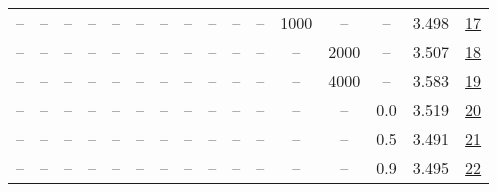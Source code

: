 \begin{table}[H]
\begin{tabular}{cccccccccccccccc}
-- & -- & -- & -- & -- & -- & -- & -- & -- & -- & -- & 1000 & -- & -- & 3.498 & \href{https://wandb.ai/stanford-mercury/optimizer-scaling/runs/sweep-130m-2B-kron8264balr0.002-wd0.7-b10.95-plr0.2-pis1-gn1-nor-52689f}{17} \\
-- & -- & -- & -- & -- & -- & -- & -- & -- & -- & -- & -- & 2000 & -- & 3.507 & \href{https://wandb.ai/stanford-mercury/optimizer-scaling/runs/sweep-130m-2B-kron9117dclr0.002-wd0.7-b10.95-plr0.2-pis1-gn1-nor-df1fa7}{18} \\
-- & -- & -- & -- & -- & -- & -- & -- & -- & -- & -- & -- & 4000 & -- & 3.583 & \href{https://wandb.ai/stanford-mercury/optimizer-scaling/runs/sweep-130m-2B-kron1999a2lr0.002-wd0.7-b10.95-plr0.2-pis1-gn1-nor-a2c96d}{19} \\
-- & -- & -- & -- & -- & -- & -- & -- & -- & -- & -- & -- & -- & 0.0 & 3.519 & \href{https://wandb.ai/stanford-mercury/optimizer-scaling/runs/sweep-130m-2B-kron26d3dclr0.002-wd0.0-b10.95-plr0.2-pis1-gn1-nor-978d74}{20} \\
-- & -- & -- & -- & -- & -- & -- & -- & -- & -- & -- & -- & -- & 0.5 & 3.491 & \href{https://wandb.ai/stanford-mercury/optimizer-scaling/runs/sweep-130m-2B-kronf8119alr0.002-wd0.5-b10.95-plr0.2-pis1-gn1-nor-2ef7b8}{21} \\
-- & -- & -- & -- & -- & -- & -- & -- & -- & -- & -- & -- & -- & 0.9 & 3.495 & \href{https://wandb.ai/stanford-mercury/optimizer-scaling/runs/sweep-130m-2B-kron476954lr0.002-wd0.9-b10.95-plr0.2-pis1-gn1-nor-356b60}{22} \\
\bottomrule
\end{tabular}
\end{table}

